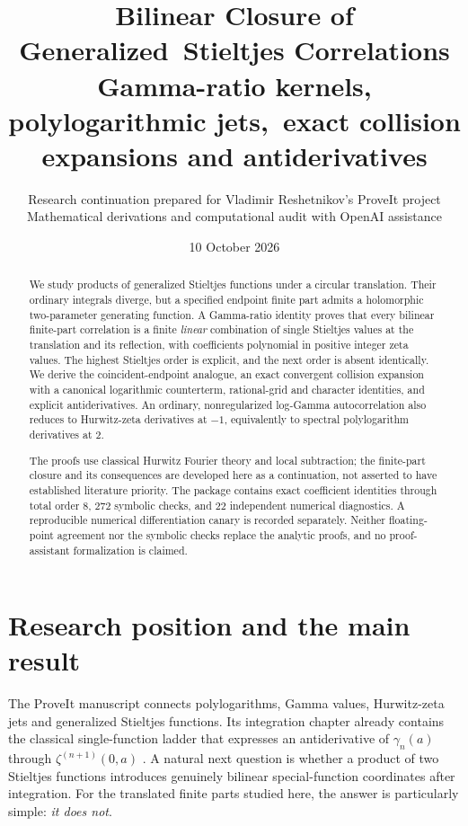 \documentclass[11pt]{article}
\title{Bilinear Closure of Generalized\ Stieltjes Correlations\\[5pt]
\large Gamma-ratio kernels, polylogarithmic jets,\ exact collision expansions and antiderivatives}
\author{Research continuation prepared for Vladimir Reshetnikov's ProveIt project\\
\small Mathematical derivations and computational audit with OpenAI assistance}
\date{10 October 2026}
\numberwithin{equation}{section}
\theoremstyle{definition}
\theoremstyle{remark}
\begin{document}
\maketitle
\thispagestyle{plain}
\begin{abstract}
We study products of generalized Stieltjes functions under a circular
translation. Their ordinary integrals diverge, but a specified endpoint
finite part admits a holomorphic two-parameter generating function.
A Gamma-ratio identity proves that every bilinear finite-part correlation
is a finite \emph{linear} combination of single Stieltjes values at the
translation and its reflection, with coefficients polynomial in positive
integer zeta values. The highest Stieltjes order is explicit, and the next
order is absent identically. We derive the coincident-endpoint analogue,
an exact convergent collision expansion with a canonical logarithmic
counterterm, rational-grid and character identities, and explicit
antiderivatives. An ordinary, nonregularized log-Gamma autocorrelation
also reduces to Hurwitz-zeta derivatives at $-1$, equivalently to spectral
polylogarithm derivatives at $2$.

The proofs use classical Hurwitz Fourier theory and local subtraction;
the finite-part closure and its consequences are developed here as a
continuation, not asserted to have established literature priority.
The package contains exact coefficient identities through total order
$8$, $272$ symbolic checks, and $22$ independent numerical diagnostics.
A reproducible numerical differentiation canary is recorded separately.
Neither floating-point agreement nor the symbolic checks replace the
analytic proofs, and no proof-assistant formalization is claimed.
\end{abstract}
\newpage
\tableofcontents
\newpage

\section{Research position and the main result}
\label{sec:position}

The ProveIt manuscript connects polylogarithms, Gamma values, Hurwitz-zeta
jets and generalized Stieltjes functions. Its integration chapter already
contains the classical single-function ladder that expresses an
antiderivative of $\gamma_n(a)$ through $\zeta^{(n+1)}(0,a)$
\cite{repo-integration}. A natural next question is whether a product of two
Stieltjes functions introduces genuinely bilinear special-function
coordinates after integration. For the translated finite parts studied
here, the answer is particularly simple: \emph{it does not}.
\end{document}
